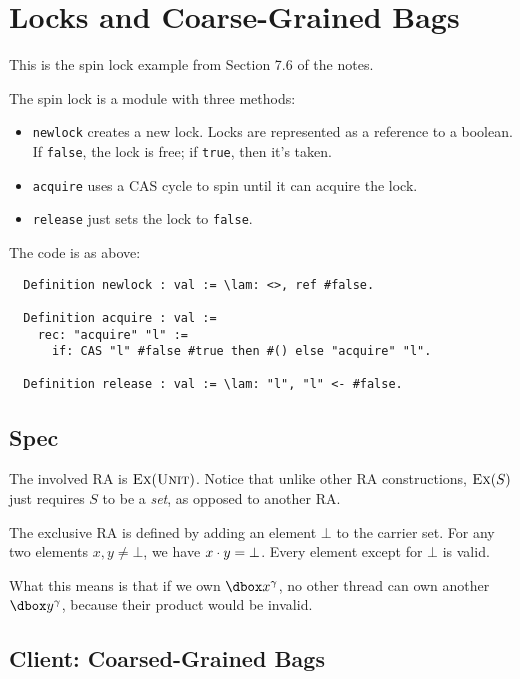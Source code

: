 \section{Locks and Coarse-Grained Bags}
\label{section:locks-and-coarse-graned-bags}


This is the spin lock example from Section 7.6 of the notes.

The spin lock is a module with three methods:
\begin{itemize}

\item \texttt{newlock} creates a new lock. Locks are represented as a reference to a boolean. If \texttt{false}, the lock is free; if \texttt{true}, then it's taken.

\item \texttt{acquire} uses a CAS cycle to spin until it can acquire the lock.

\item  \texttt{release} just sets the lock to \texttt{false}.

\end{itemize}

The code is as above:

\begin{verbatim}
  Definition newlock : val := \lam: <>, ref #false.
    
  Definition acquire : val :=
    rec: "acquire" "l" :=
      if: CAS "l" #false #true then #() else "acquire" "l".
    
  Definition release : val := \lam: "l", "l" <- #false.
\end{verbatim}

\subsection{Spec}

The involved RA is $\textsc{Ex}(\textsc{Unit})$. Notice that unlike other RA constructions, $\textsc{Ex}(S)$ just requires $S$ to be a \emph{set}, as opposed to another RA.

The exclusive RA is defined by adding an element $\bot$ to the carrier set. For any two elements $x, y \ne \bot$, we have $x \cdot y = \bot$. Every element except for $\bot$ is valid.

What this means is that if we own $\ownr{x}{\gamma}$, no other thread can own another $\ownr{y}{\gamma}$, because their product would be invalid.

\subsection{Client: Coarsed-Grained Bags}